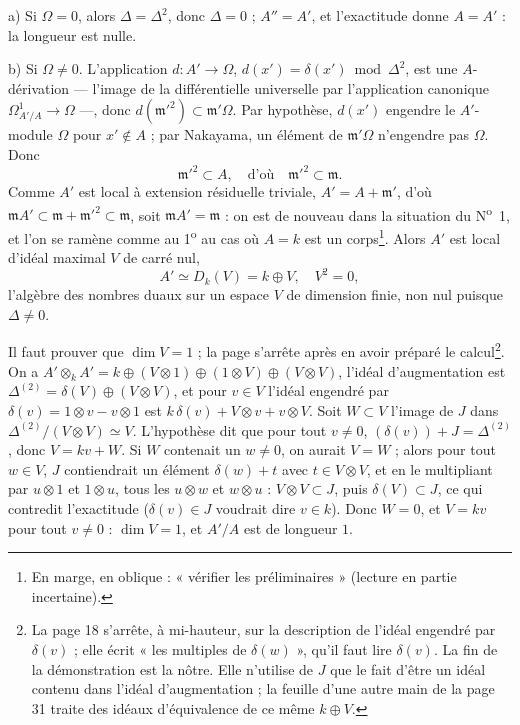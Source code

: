 \documentclass[11pt,a4paper]{article}
\begin{document}
a) Si $\Omega = 0$, alors $\Delta = \Delta^2$, donc $\Delta = 0$ ; $A'' =
A'$, et l'exactitude donne $A = A'$ : la longueur est nulle.

b) Si $\Omega \neq 0$. L'application $d : A' \to \Omega$, $d(x') =
\delta(x') \bmod \Delta^2$, est une $A$-dérivation — l'image de la
différentielle universelle par l'application canonique $\Omega^1_{A'/A} \to
\Omega$ —, donc $d(\mathfrak{m}'^2) \subset \mathfrak{m}'\Omega$. Par
hypothèse, $d(x')$ engendre le $A'$-module $\Omega$ pour $x' \notin A$ ; par
Nakayama, un élément de $\mathfrak{m}'\Omega$ n'engendre pas $\Omega$. Donc
\[
  \mathfrak{m}'^2 \subset A , \quad \text{d'où} \quad \mathfrak{m}'^2 \subset
  \mathfrak{m} .
\]
Comme $A'$ est local à extension résiduelle triviale, $A' = A +
\mathfrak{m}'$, d'où $\mathfrak{m}A' \subset \mathfrak{m} + \mathfrak{m}'^2
\subset \mathfrak{m}$, soit $\mathfrak{m}A' = \mathfrak{m}$ : on est de
nouveau dans la situation du N\textsuperscript{o}~1, et l'on se ramène comme
au 1\textsuperscript{o} au cas où $A = k$ est un corps\footnote{En marge, en
oblique : « vérifier les préliminaires » (lecture en partie incertaine).}.
Alors $A'$ est local d'idéal maximal $V$ de carré nul,
\[
  A' \simeq D_k(V) = k \oplus V , \quad V^2 = 0 ,
\]
l'algèbre des nombres duaux sur un espace $V$ de dimension finie, non nul
puisque $\Delta \neq 0$.

Il faut prouver que $\dim V = 1$ ; la page s'arrête après en avoir préparé
le calcul\footnote{La page 18 s'arrête, à mi-hauteur, sur la description de
l'idéal engendré par $\delta(v)$ ; elle écrit « les multiples de
$\delta(w)$ », qu'il faut lire $\delta(v)$. La fin de la démonstration est la
nôtre. Elle n'utilise de $J$ que le fait d'être un idéal contenu dans
l'idéal d'augmentation ; la feuille d'une autre main de la page 31 traite des
idéaux d'équivalence de ce même $k \oplus V$.}. On a $A' \otimes_k A' = k
\oplus (V \otimes 1) \oplus (1 \otimes V) \oplus (V \otimes V)$, l'idéal
d'augmentation est $\Delta^{(2)} = \delta(V) \oplus (V \otimes V)$, et pour
$v \in V$ l'idéal engendré par $\delta(v) = 1 \otimes v - v \otimes 1$ est
$k\,\delta(v) + V \otimes v + v \otimes V$. Soit $W \subset V$ l'image de $J$
dans $\Delta^{(2)}/(V \otimes V) \simeq V$. L'hypothèse dit que pour tout $v
\neq 0$, $(\delta(v)) + J = \Delta^{(2)}$, donc $V = kv + W$. Si $W$
contenait un $w \neq 0$, on aurait $V = W$ ; alors pour tout $w \in V$, $J$
contiendrait un élément $\delta(w) + t$ avec $t \in V \otimes V$, et en le
multipliant par $u \otimes 1$ et $1 \otimes u$, tous les $u \otimes w$ et $w
\otimes u$ : $V \otimes V \subset J$, puis $\delta(V) \subset J$, ce qui
contredit l'exactitude ($\delta(v) \in J$ voudrait dire $v \in k$). Donc $W
= 0$, et $V = kv$ pour tout $v \neq 0$ : $\dim V = 1$, et $A'/A$ est de
longueur $1$.
\end{document}
